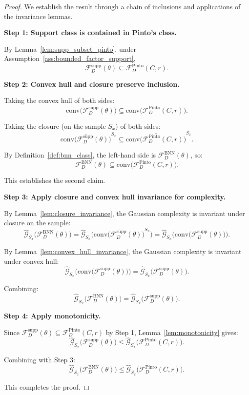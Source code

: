\documentclass{article}
\theoremstyle{plain}
\theoremstyle{definition}
\theoremstyle{remark}
\begin{document}
\begin{proof}
We establish the result through a chain of inclusions and applications of the invariance lemmas.

\textbf{Step 1: Support class is contained in Pinto's class.}

By Lemma~\ref{lem:supp_subset_pinto}, under Assumption~\ref{ass:bounded_factor_support},
\[
\mathcal{F}^{\mathrm{supp}}_D(\theta)\subseteq \mathcal{F}^{\mathrm{Pinto}}_D(C,r).
\]

\textbf{Step 2: Convex hull and closure preserve inclusion.}

Taking the convex hull of both sides:
\[
\mathrm{conv}\big(\mathcal{F}^{\mathrm{supp}}_D(\theta)\big)
\subseteq
\mathrm{conv}\big(\mathcal{F}^{\mathrm{Pinto}}_D(C,r)\big).
\]

Taking the closure (on the sample $S_x$) of both sides:
\[
\overline{\mathrm{conv}\big(\mathcal{F}^{\mathrm{supp}}_D(\theta)\big)}^{S_x}
\subseteq
\overline{\mathrm{conv}\big(\mathcal{F}^{\mathrm{Pinto}}_D(C,r)\big)}^{S_x}.
\]

By Definition~\ref{def:bnn_class}, the left-hand side is $\mathcal{F}^{\mathrm{BNN}}_D(\theta)$, so:
\[
\mathcal{F}^{\mathrm{BNN}}_D(\theta)
\subseteq
\overline{\mathrm{conv}}\!\big(\mathcal{F}^{\mathrm{Pinto}}_D(C,r)\big).
\]

This establishes the second claim.

\textbf{Step 3: Apply closure and convex hull invariance for complexity.}

By Lemma~\ref{lem:closure_invariance}, the Gaussian complexity is invariant under closure on the sample:
\[
\hat{\mathcal{G}}_{S_x}\big(\mathcal{F}^{\mathrm{BNN}}_D(\theta)\big)
=
\hat{\mathcal{G}}_{S_x}\big(\overline{\mathrm{conv}\big(\mathcal{F}^{\mathrm{supp}}_D(\theta)\big)}^{S_x}\big)
=
\hat{\mathcal{G}}_{S_x}\big(\mathrm{conv}\big(\mathcal{F}^{\mathrm{supp}}_D(\theta)\big)\big).
\]

By Lemma~\ref{lem:convex_hull_invariance}, the Gaussian complexity is invariant under convex hull:
\[
\hat{\mathcal{G}}_{S_x}\big(\mathrm{conv}\big(\mathcal{F}^{\mathrm{supp}}_D(\theta)\big)\big)
=
\hat{\mathcal{G}}_{S_x}\big(\mathcal{F}^{\mathrm{supp}}_D(\theta)\big).
\]

Combining:
\[
\hat{\mathcal{G}}_{S_x}\big(\mathcal{F}^{\mathrm{BNN}}_D(\theta)\big)
=
\hat{\mathcal{G}}_{S_x}\big(\mathcal{F}^{\mathrm{supp}}_D(\theta)\big).
\]

\textbf{Step 4: Apply monotonicity.}

Since $\mathcal{F}^{\mathrm{supp}}_D(\theta)\subseteq \mathcal{F}^{\mathrm{Pinto}}_D(C,r)$ by Step 1, Lemma~\ref{lem:monotonicity} gives:
\[
\hat{\mathcal{G}}_{S_x}\big(\mathcal{F}^{\mathrm{supp}}_D(\theta)\big)
\le
\hat{\mathcal{G}}_{S_x}\big(\mathcal{F}^{\mathrm{Pinto}}_D(C,r)\big).
\]

Combining with Step 3:
\[
\hat{\mathcal{G}}_{S_x}\big(\mathcal{F}^{\mathrm{BNN}}_D(\theta)\big)
\le
\hat{\mathcal{G}}_{S_x}\big(\mathcal{F}^{\mathrm{Pinto}}_D(C,r)\big).
\]

This completes the proof.
\end{proof}
\end{document}
